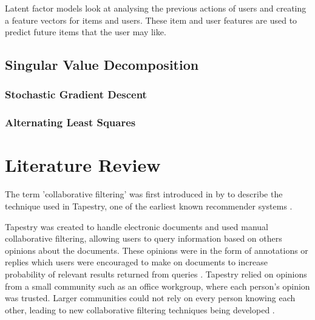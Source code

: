 Latent factor models look at analysing the previous actions of users and creating a feature vectors for items and users. These item and user features are used to predict future items that the user may like. 

\subsection{Singular Value Decomposition}
\subsubsection{Stochastic Gradient Descent}
\subsubsection{Alternating Least Squares}


\section{Literature Review}

The term 'collaborative filtering' was first introduced in \citeyear{goldberg1992using} by \citeauthor{goldberg1992using} to describe the technique used in Tapestry, one of the earliest known recommender systems \cite{koren2009matrix,  goldberg1992using, itembased, survey}.

Tapestry \cite{goldberg1992using} was created to handle electronic documents and used manual collaborative filtering, allowing users to query information based on others opinions about the documents. These opinions were in the form of annotations or replies which users were encouraged to make on documents to increase probability of relevant results returned from queries \cite{schafer2007collaborative}. Tapestry relied on opinions from a small community such as an office workgroup, where each person's opinion was trusted. Larger communities could not rely on every person knowing each other, leading to new collaborative filtering techniques being developed \cite{itembased}. 

